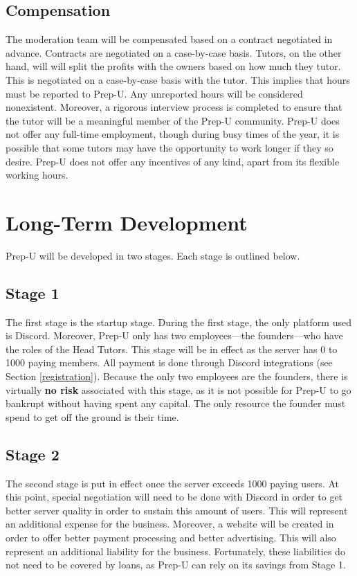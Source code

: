 \documentclass{business}
\begin{document}
    \subsection{Compensation}
    The moderation team will be compensated based on a contract negotiated in advance. Contracts are negotiated on a case-by-case basis. Tutors, on the other hand, will will split the profits with the owners based on how much they tutor. This is negotiated on a case-by-case basis with the tutor. This implies that hours must be reported to Prep-U. Any unreported hours will be considered nonexistent. Moreover, a rigorous interview process is completed to ensure that the tutor will be a meaningful member of the Prep-U community.  Prep-U does not offer any full-time employment, though during busy times of the year, it is possible that some tutors may have the opportunity to work longer if they so desire. Prep-U does not offer any incentives of any kind, apart from its flexible working hours. 
    \section{Long-Term Development}\label{long-term}
    Prep-U will be developed in two stages. Each stage is outlined below.
    \subsection{Stage 1}\label{stage-1}
    The first stage is the startup stage. During the first stage, the only platform used is Discord. Moreover, Prep-U only has two employees––the founders––who have the roles of the Head Tutors. This stage will be in effect as the server has 0 to 1000 paying members. All payment is done through Discord integrations (see Section \ref{registration}). Because the only two employees are the founders, there is virtually \textbf{no risk} associated with this stage, as it is not possible for Prep-U to go bankrupt without having spent any capital. The only resource the founder must spend to get off the ground is their time.
    \subsection{Stage 2}
    The second stage is put in effect once the server exceeds 1000 paying users. At this point, special negotiation will need to be done with Discord in order to get better server quality in order to sustain this amount of users. This will represent an additional expense for the business. Moreover, a website will be created in order to offer better payment processing and better advertising. This will also represent an additional liability for the business. Fortunately, these liabilities do not need to be covered by loans, as Prep-U can rely on its savings from Stage 1.
\end{document}
